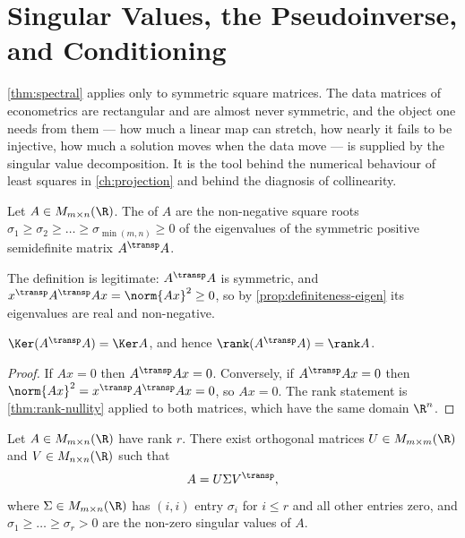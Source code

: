 \section{Singular Values, the Pseudoinverse, and Conditioning}
\label{sec:lin-svd}

\autoref{thm:spectral} applies only to symmetric square matrices. The data
matrices of econometrics are rectangular and are almost never symmetric, and the
object one needs from them --- how much a linear map can stretch, how nearly it
fails to be injective, how much a solution moves when the data move --- is
supplied by the singular value decomposition. It is the tool behind the numerical
behaviour of least squares in \autoref{ch:projection} and behind the diagnosis of
collinearity.

\begin{definition}\label{def:singular-values}
	Let $A\in M_{m\times n}(\R)$. The  of
	$A$ are the non-negative square roots
	$\sigma_1\geq\sigma_2\geq\dots\geq\sigma_{\min(m,n)}\geq0$ of the eigenvalues
	of the symmetric positive semidefinite matrix $A^{\transp}A$.
\end{definition}

The definition is legitimate: $A^{\transp}A$ is symmetric, and
$x^{\transp}A^{\transp}Ax=\norm{Ax}^2\geq0$, so by
\autoref{prop:definiteness-eigen} its eigenvalues are real and non-negative.

\begin{lemma}\label{lem:kernel-ata}
	$\Ker(A^{\transp}A)=\Ker A$, and hence $\rank(A^{\transp}A)=\rank A$.
\end{lemma}

\begin{proof}
	If $Ax=0$ then $A^{\transp}Ax=0$. Conversely, if $A^{\transp}Ax=0$ then
	$\norm{Ax}^2=x^{\transp}A^{\transp}Ax=0$, so $Ax=0$. The rank statement is
	\autoref{thm:rank-nullity} applied to both matrices, which have the same domain
	$\R^n$.
\end{proof}

\begin{theorem}\label{thm:svd}
	Let $A\in M_{m\times n}(\R)$ have rank $r$. There exist orthogonal matrices
	$U\in M_{m\times m}(\R)$ and $V\in M_{n\times n}(\R)$ such that
	\begin{equation}\label{eq:svd}
		A=U\Sigma V^{\transp},
	\end{equation}
	where $\Sigma\in M_{m\times n}(\R)$ has $(i,i)$ entry $\sigma_i$ for
	$i\leq r$ and all other entries zero, and $\sigma_1\geq\dots\geq\sigma_r>0$ are
	the non-zero singular values of $A$.
\end{theorem}

